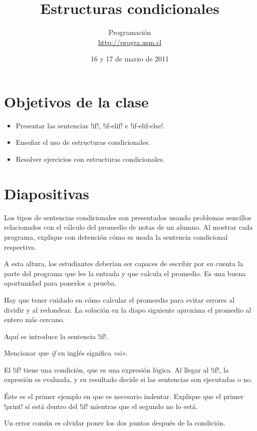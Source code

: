 \documentclass[10pt]{article}
\title{Estructuras condicionales}
\author{Programación \\ \url{http://progra.usm.cl}}
\date{16 y 17 de marzo de 2011}
\begin{document}
  \maketitle

  \section*{Objetivos de la clase}
  \begin{itemize}
    \item Presentar las sentencias \li!if!, \li!if-elif! e \li!if-elif-else!.
    \item Enseñar el uso de estructuras condicionales.
    \item Resolver ejercicios con estructuras condicionales.
  \end{itemize}

  \section*{Diapositivas}

  Los tipos de sentencias condicionales
  son presentados usando problemas sencillos
  relacionados con el cálculo del promedio de notas de un alumno.
  Al mostrar cada programa,
  explique con detención cómo es usada la sentencia condicional respectiva.


  A esta altura, los estudiantes deberían ser capaces
  de escribir por su cuenta
  la parte del programa que lee la entrada y que calcula el promedio.
  Es una buena oportunidad para ponerlos a prueba.

  Hay que tener cuidado en cómo calcular el promeedio
  para evitar errores al dividir y al redondear.
  La solución en la diapo siguiente
  aproxima el promedio al entero más cercano.


  Aquí se introduce la sentencia \li!if!.

  Mencionar que \emph{if} en inglés significa «si».

  El \li!if! tiene una condición,
  que es una expresión lógica.
  Al llegar al \li!if!, la expresión es evaluada,
  y su resultado decide si las sentencias son ejecutadas o no.

  Éste es el primer ejemplo
  en que es necesario indentar.
  Explique que el primer \li!print! sí está dentro del \li!if!
  mientras que el segundo no lo está.

  Un error común es olvidar poner los dos puntos después de la condición.
\end{document}
